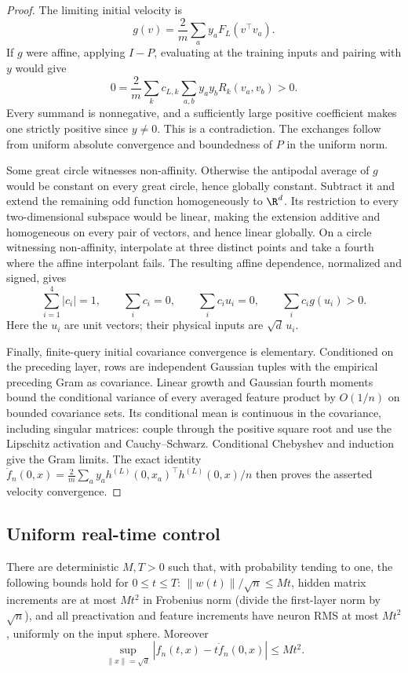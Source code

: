 \begin{proof}
The limiting initial velocity is
\[
 g(v)=\frac2m\sum_a y_aF_L(v^\top v_a).
\]
If $g$ were affine, applying $I-P$, evaluating at the training inputs and
pairing with $y$ would give
\[
 0=\frac2m\sum_k c_{L,k}
       \sum_{a,b}y_ay_bR_k(v_a,v_b)>0.
\]
Every summand is nonnegative, and a sufficiently large positive coefficient
makes one strictly positive since $y\ne0$. This is a contradiction.
The exchanges follow from uniform absolute convergence and boundedness of
$P$ in the uniform norm.

Some great circle witnesses non-affinity. Otherwise the antipodal average
of $g$ would be constant on every great circle, hence globally constant.
Subtract it and extend the remaining odd function homogeneously to
$\R^d$. Its restriction to every two-dimensional subspace would be linear,
making the extension additive and homogeneous on every pair of vectors,
and hence linear globally. On a circle witnessing non-affinity, interpolate
at three distinct points and take a fourth where the affine interpolant
fails. The resulting affine dependence, normalized and signed, gives
\begin{equation}
 \sum_{i=1}^4|c_i|=1,\qquad \sum_i c_i=0,\qquad
 \sum_i c_i u_i=0,\qquad \sum_i c_i g(u_i)>0.
 \label{fl:four-witness}
\end{equation}
Here the $u_i$ are unit vectors; their physical inputs are $\sqrt d\,u_i$.

Finally, finite-query initial covariance convergence is elementary.
Conditioned on the preceding layer, rows are independent Gaussian tuples
with the empirical preceding Gram as covariance. Linear growth and Gaussian
fourth moments bound the conditional variance of every averaged feature
product by $O(1/n)$ on bounded covariance sets. Its conditional mean is
continuous in the covariance, including singular matrices: couple through
the positive square root and use the Lipschitz activation and
Cauchy--Schwarz. Conditional Chebyshev and induction give the Gram limits.
The exact identity
$\dot f_n(0,x)=\frac2m\sum_a y_a h^{(L)}(0,x_a)^\top h^{(L)}(0,x)/n$
then proves the asserted velocity convergence.
\end{proof}

\subsection{Uniform real-time control}

\begin{lemma}
\label{fl:bootstrap}
There are deterministic $M,T>0$ such that, with probability tending to one,
the following bounds hold for $0\le t\le T$:
$\|w(t)\|/\sqrt n\le Mt$, hidden matrix increments are at most $Mt^2$
in Frobenius norm (divide the first-layer norm by $\sqrt n$), and all
preactivation and feature increments have neuron RMS at most $Mt^2$,
uniformly on the input sphere. Moreover
\begin{equation}
 \sup_{\|x\|=\sqrt d}|f_n(t,x)-t\dot f_n(0,x)|\le Mt^2.
 \label{fl:first-remainder}
\end{equation}
\end{lemma}


